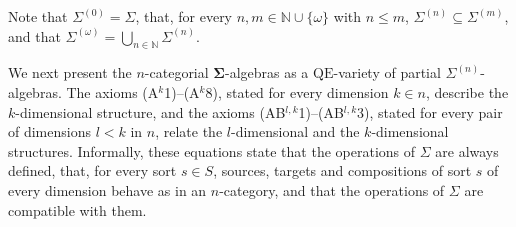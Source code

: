 \documentclass{amsart}
\theoremstyle{plain}
\theoremstyle{definition}
\begin{document}
Note that $\Sigma^{(0)}=\Sigma$, that, for every $n,m\in\mathbb{N}\cup\{\omega\}$ with $n\leq m$, $\Sigma^{(n)}\subseteq\Sigma^{(m)}$, and that $\Sigma^{(\omega)}=\bigcup_{n\in\mathbb{N}}\Sigma^{(n)}$.

We next present the $n$-categorial $\mathbf{\Sigma}$-algebras as a $\mathrm{QE}$-variety of partial $\Sigma^{(n)}$-algebras. The axioms (A$^{k}$1)--(A$^{k}$8), stated for every dimension $k\in n$, describe the $k$-dimensional structure, and the axioms (AB$^{l,k}$1)--(AB$^{l,k}$3), stated for every pair of dimensions $l<k$ in $n$, relate the $l$-dimensional and the $k$-dimensional structures. Informally, these equations state that the operations of $\Sigma$ are always defined, that, for every sort $s\in S$, sources, targets and compositions of sort $s$ of every dimension behave as in an $n$-category, and that the operations of $\Sigma$ are compatible with them.
\end{document}
